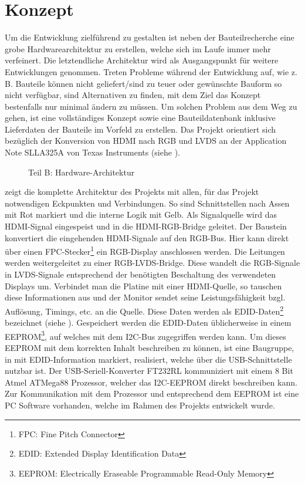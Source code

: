\section{Konzept}
\label{sec:TeilB_Konzept}
Um die Entwicklung zielführend zu gestalten ist neben der Bauteilrecherche eine grobe Hardwarearchitektur zu erstellen, welche sich im Laufe immer mehr verfeinert. Die letztendliche Architektur wird als Ausgangspunkt für weitere Entwicklungen genommen. Treten Probleme während der Entwicklung auf, wie z. B. Bauteile können nicht geliefert/sind zu teuer oder gewünschte Bauform so nicht verfügbar, sind Alternativen zu finden, mit dem Ziel das Konzept bestenfalls nur minimal ändern zu müssen. Um solchen Problem aus dem Weg zu gehen, ist eine vollständiges Konzept sowie eine Bauteildatenbank inklusive Lieferdaten der Bauteile im Vorfeld zu erstellen. Das Projekt orientiert sich bezüglich der Konversion von HDMI nach RGB und LVDS an der Application Note SLLA325A von Texas Instruments (siehe \cite{TI2013}).
\begin{figure}[htp]
	\centering
{}
	\caption{Teil B: Hardware-Architektur}
	\label{fig:teilb_architektur}
\end{figure}

 zeigt die komplette Architektur des Projekts mit allen, für das Projekt notwendigen Eckpunkten und Verbindungen. So sind Schnittstellen nach Assen mit Rot markiert und die interne Logik mit Gelb. Als Signalquelle wird das HDMI-Signal eingespeist und in die HDMI-RGB-Bridge geleitet. Der Baustein  konvertiert die eingehenden HDMI-Signale auf den RGB-Bus. Hier kann direkt über einen FPC-Stecker\footnote{FPC: Fine Pitch Connector} ein RGB-Display anschlossen werden. Die Leitungen werden weitergeleitet zu einer RGB-LVDS-Bridge. Diese wandelt die RGB-Signale in LVDS-Signale entsprechend der benötigten Beschaltung des verwendeten Displays um. Verbindet man die Platine mit einer HDMI-Quelle, so tauschen diese Informationen aus und der Monitor sendet seine Leistungsfähigkeit bzgl. Auflösung, Timings, etc. an die Quelle. Diese Daten werden als EDID-Daten\footnote{EDID: Extended Display Identification Data} bezeichnet (siehe \cite{}). Gespeichert werden die EDID-Daten üblicherweise in einem EEPROM\footnote{EEPROM: Electrically Eraseable Programmable Read-Only Memory}, auf welches mit dem I2C-Bus zugegriffen werden kann. Um dieses EEPROM mit dem korrekten Inhalt beschreiben zu können, ist eine Baugruppe, in  mit EDID-Information markiert, realisiert, welche über die USB-Schnittstelle nutzbar ist. Der USB-Seriell-Konverter FT232RL kommuniziert mit einem 8 Bit Atmel ATMega88 Prozessor, welcher das I2C-EEPROM direkt beschreiben kann. Zur Kommunikation mit dem Prozessor und entsprechend dem EEPROM ist eine PC Software vorhanden, welche im Rahmen des Projekts entwickelt wurde. 